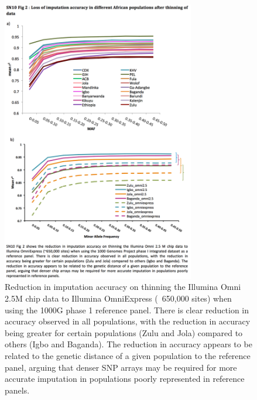 \begin{figure}
\centering
\includegraphics[trim={0 5.5cm 0 15.5cm},clip,width=0.75\textwidth]{fig/SN10f2}
\caption[Reduction in imputation accuracy on thinning the Illumina Omni 2.5M chip data to Illumina OmniExpress.]{Reduction in imputation accuracy on thinning the Illumina Omni 2.5M chip data to Illumina OmniExpress (~650,000 sites) when using the \gls{1000G} phase 1 reference panel. There is clear reduction in accuracy observed in all populations, with the reduction in accuracy being greater for certain populations (Zulu and Jola) compared to others (Igbo and Baganda). The reduction in accuracy appears to be related to the genetic distance of a given population to the reference panel, arguing that denser SNP arrays may be required for more accurate imputation in populations poorly represented in reference panels.}
\label{fig:SN10f2}
\end{figure}